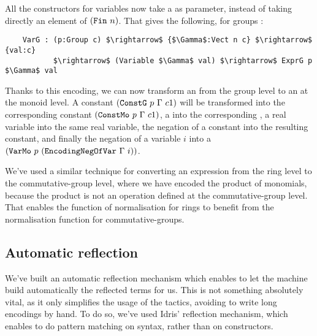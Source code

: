 All the constructors for variables now take a  as parameter, instead of taking directly an element of $(\code{Fin}\ n)$. That gives the following, for groups :

\begin{lstlisting}
    VarG : (p:Group c) $\rightarrow$ {$\Gamma$:Vect n c} $\rightarrow$ {val:c} 
           $\rightarrow$ (Variable $\Gamma$ val) $\rightarrow$ ExprG p $\Gamma$ val
\end{lstlisting}


Thanks to this encoding, we can now transform an  from the group level to an  at the monoid level. A constant $({\mbox{\texttt{ConstG}}}\ p\ \Gamma\ c1)$ will be transformed into the corresponding constant $({\mbox{\texttt{ConstMo}}}\ p\ \Gamma\ c1)$, a  into the corresponding , a real variable into the same real variable, the negation of a constant into the resulting constant, and finally the negation of a variable $i$ into a $(\code{VarMo}\ p\ (\code{EncodingNegOfVar}\ \Gamma\ i))$.

We've used a similar technique for converting an expression from the ring level to the commutative-group level, where we have encoded the product of monomials, because the product is not an operation defined at the commutative-group level. That enables the function of normalisation for rings to benefit from the normalisation function for commutative-groups.


\subsection{Automatic reflection}
		
We've built an automatic reflection mechanism which enables to let the machine build automatically the reflected terms for us. This is not something absolutely vital, as it only simplifies the usage of the tactics, avoiding to write long encodings by hand. To do so, we've used Idris' reflection mechanism, which enables to do pattern matching on syntax, rather than on constructors. 



